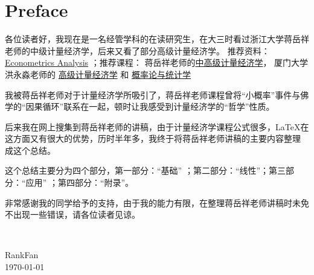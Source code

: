 
 \chapter{Preface}

各位读者好，我现在是一名经管学科的在读研究生，在大三时看过浙江大学蒋岳祥老师的中级计量经济学，后来又看了部分高级计量经济学。
推荐资料：\href{https://bbs.pinggu.org/a-503441.html}{Econometrics Analysis} ；推荐课程：
蒋岳祥老师的\href{https://www.bilibili.com/video/BV1es411W7KU?from=search&seid=3253765381861883959}{中高级计量经济学}，
厦门大学洪永淼老师的
\href{https://www.icourse163.org/course/XMU-1002606048}{高级计量经济学}  和
\href{https://www.bilibili.com/video/BV11t411A7bp}{概率论与统计学}

\vspace{0.5em}
我被蒋岳祥老师对于计量经济学所吸引了，蒋岳祥老师课程曾将“小概率”事件与佛学的“因果循环”联系在一起，顿时让我感受到计量经济学的“哲学”性质。

\vspace{0.5em}
后来我在网上搜集到蒋岳祥老师的讲稿，由于计量经济学课程公式很多，\LaTeX 在这方面又有很大的优势，历时半年多，我终于将蒋岳祥老师讲稿的主要内容整理
成这个总结。

\vspace{0.5em}
这个总结主要分为四个部分，第一部分：“基础” ；第二部分：“线性”；第三部分：“应用” ；第四部分：“附录”。

\vspace{0.5em}
非常感谢我的同学给予的支持，由于我的能力有限，在整理蒋岳祥老师讲稿时未免不出现一些错误，请各位读者见谅。


~ \ \
\\[3em]

\begin{flushright}
    RankFan \quad  \\ 
    \today
\end{flushright}


